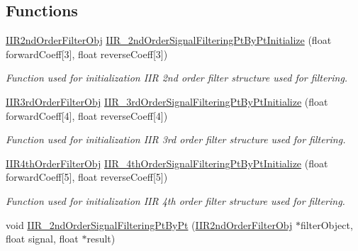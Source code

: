 \subsection*{Functions}
\begin{DoxyCompactItemize}
\item 
\mbox{\hyperlink{struct_i_i_r2nd_order_filter_obj}{I\+I\+R2nd\+Order\+Filter\+Obj}} \mbox{\hyperlink{group___i_i_rfilter_pt_by_pt_gaf289af032ed0838cac25efd5cc1ea639_gaf289af032ed0838cac25efd5cc1ea639}{I\+I\+R\+\_\+2nd\+Order\+Signal\+Filtering\+Pt\+By\+Pt\+Initialize}} (float forward\+Coeff\mbox{[}3\mbox{]}, float reverse\+Coeff\mbox{[}3\mbox{]})
\begin{DoxyCompactList}\small\item\em Function used for initialization I\+IR 2nd order filter structure used for filtering. \end{DoxyCompactList}\item 
\mbox{\hyperlink{struct_i_i_r3rd_order_filter_obj}{I\+I\+R3rd\+Order\+Filter\+Obj}} \mbox{\hyperlink{group___i_i_rfilter_pt_by_pt_gad9f7b6a49c25d0716d840945adde16db_gad9f7b6a49c25d0716d840945adde16db}{I\+I\+R\+\_\+3rd\+Order\+Signal\+Filtering\+Pt\+By\+Pt\+Initialize}} (float forward\+Coeff\mbox{[}4\mbox{]}, float reverse\+Coeff\mbox{[}4\mbox{]})
\begin{DoxyCompactList}\small\item\em Function used for initialization I\+IR 3rd order filter structure used for filtering. \end{DoxyCompactList}\item 
\mbox{\hyperlink{struct_i_i_r4th_order_filter_obj}{I\+I\+R4th\+Order\+Filter\+Obj}} \mbox{\hyperlink{group___i_i_rfilter_pt_by_pt_gaaa95a7e8b259b53ea999d004611acd54_gaaa95a7e8b259b53ea999d004611acd54}{I\+I\+R\+\_\+4th\+Order\+Signal\+Filtering\+Pt\+By\+Pt\+Initialize}} (float forward\+Coeff\mbox{[}5\mbox{]}, float reverse\+Coeff\mbox{[}5\mbox{]})
\begin{DoxyCompactList}\small\item\em Function used for initialization I\+IR 4th order filter structure used for filtering. \end{DoxyCompactList}\item 
void \mbox{\hyperlink{group___i_i_rfilter_pt_by_pt_gac4abd6664e9f907ee9a9a7dc9bb9f72a_gac4abd6664e9f907ee9a9a7dc9bb9f72a}{I\+I\+R\+\_\+2nd\+Order\+Signal\+Filtering\+Pt\+By\+Pt}} (\mbox{\hyperlink{struct_i_i_r2nd_order_filter_obj}{I\+I\+R2nd\+Order\+Filter\+Obj}} $\ast$filter\+Object, float signal, float $\ast$result)

\end{DoxyCompactItemize}
